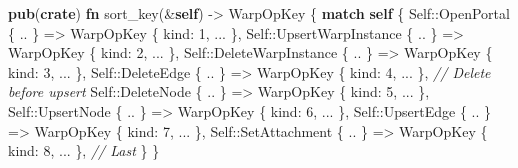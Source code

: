 \documentclass[11pt]{book}
\newenvironment{Shaded}{}{}
\newcommand{\CommentTok}[1]{\textcolor[rgb]{0.38,0.63,0.69}{\textit{#1}}}
\newcommand{\ControlFlowTok}[1]{\textcolor[rgb]{0.00,0.44,0.13}{\textbf{#1}}}
\newcommand{\DataTypeTok}[1]{\textcolor[rgb]{0.56,0.13,0.00}{#1}}
\newcommand{\DecValTok}[1]{\textcolor[rgb]{0.25,0.63,0.44}{#1}}
\newcommand{\KeywordTok}[1]{\textcolor[rgb]{0.00,0.44,0.13}{\textbf{#1}}}
\newcommand{\NormalTok}[1]{#1}
\newcommand{\OperatorTok}[1]{\textcolor[rgb]{0.40,0.40,0.40}{#1}}
\newcommand{\PreprocessorTok}[1]{\textcolor[rgb]{0.74,0.48,0.00}{#1}}
\begin{document}
\begin{Shaded}
\begin{Highlighting}[]
\KeywordTok{pub}\NormalTok{(}\KeywordTok{crate}\NormalTok{) }\KeywordTok{fn}\NormalTok{ sort\_key(}\OperatorTok{\&}\KeywordTok{self}\NormalTok{) }\OperatorTok{{-}\textgreater{}}\NormalTok{ WarpOpKey }\OperatorTok{\{}
    \ControlFlowTok{match} \KeywordTok{self} \OperatorTok{\{}
        \DataTypeTok{Self}\PreprocessorTok{::}\NormalTok{OpenPortal }\OperatorTok{\{} \OperatorTok{..} \OperatorTok{\}}        \OperatorTok{=\textgreater{}}\NormalTok{ WarpOpKey }\OperatorTok{\{}\NormalTok{ kind}\OperatorTok{:} \DecValTok{1}\OperatorTok{,} \OperatorTok{...} \OperatorTok{\},}
        \DataTypeTok{Self}\PreprocessorTok{::}\NormalTok{UpsertWarpInstance }\OperatorTok{\{} \OperatorTok{..} \OperatorTok{\}} \OperatorTok{=\textgreater{}}\NormalTok{ WarpOpKey }\OperatorTok{\{}\NormalTok{ kind}\OperatorTok{:} \DecValTok{2}\OperatorTok{,} \OperatorTok{...} \OperatorTok{\},}
        \DataTypeTok{Self}\PreprocessorTok{::}\NormalTok{DeleteWarpInstance }\OperatorTok{\{} \OperatorTok{..} \OperatorTok{\}} \OperatorTok{=\textgreater{}}\NormalTok{ WarpOpKey }\OperatorTok{\{}\NormalTok{ kind}\OperatorTok{:} \DecValTok{3}\OperatorTok{,} \OperatorTok{...} \OperatorTok{\},}
        \DataTypeTok{Self}\PreprocessorTok{::}\NormalTok{DeleteEdge }\OperatorTok{\{} \OperatorTok{..} \OperatorTok{\}}        \OperatorTok{=\textgreater{}}\NormalTok{ WarpOpKey }\OperatorTok{\{}\NormalTok{ kind}\OperatorTok{:} \DecValTok{4}\OperatorTok{,} \OperatorTok{...} \OperatorTok{\},}  \CommentTok{// Delete before upsert}
        \DataTypeTok{Self}\PreprocessorTok{::}\NormalTok{DeleteNode }\OperatorTok{\{} \OperatorTok{..} \OperatorTok{\}}        \OperatorTok{=\textgreater{}}\NormalTok{ WarpOpKey }\OperatorTok{\{}\NormalTok{ kind}\OperatorTok{:} \DecValTok{5}\OperatorTok{,} \OperatorTok{...} \OperatorTok{\},}
        \DataTypeTok{Self}\PreprocessorTok{::}\NormalTok{UpsertNode }\OperatorTok{\{} \OperatorTok{..} \OperatorTok{\}}        \OperatorTok{=\textgreater{}}\NormalTok{ WarpOpKey }\OperatorTok{\{}\NormalTok{ kind}\OperatorTok{:} \DecValTok{6}\OperatorTok{,} \OperatorTok{...} \OperatorTok{\},}
        \DataTypeTok{Self}\PreprocessorTok{::}\NormalTok{UpsertEdge }\OperatorTok{\{} \OperatorTok{..} \OperatorTok{\}}        \OperatorTok{=\textgreater{}}\NormalTok{ WarpOpKey }\OperatorTok{\{}\NormalTok{ kind}\OperatorTok{:} \DecValTok{7}\OperatorTok{,} \OperatorTok{...} \OperatorTok{\},}
        \DataTypeTok{Self}\PreprocessorTok{::}\NormalTok{SetAttachment }\OperatorTok{\{} \OperatorTok{..} \OperatorTok{\}}     \OperatorTok{=\textgreater{}}\NormalTok{ WarpOpKey }\OperatorTok{\{}\NormalTok{ kind}\OperatorTok{:} \DecValTok{8}\OperatorTok{,} \OperatorTok{...} \OperatorTok{\},}  \CommentTok{// Last}
    \OperatorTok{\}}
\OperatorTok{\}}
\end{Highlighting}
\end{Shaded}
\end{document}
